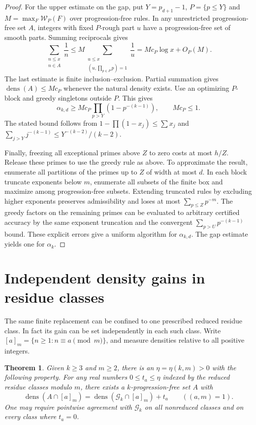 \documentclass[11pt]{article}
\newtheorem{theorem}{Theorem}
\newcommand{\dens}{\operatorname{dens}}
\newcommand{\GP}{\mathcal G_k}
\newcommand{\weight}{\mathcal W}
\begin{document}
\begin{proof}
For the upper estimate on the gap, put $Y=p_{d+1}-1$, $P=\{p\le Y\}$ and $M=\max_F\weight_P(F)$ over progression-free rules. In any unrestricted progression-free set $A$, integers with fixed $P$-rough part $u$ have a progression-free set of smooth parts. Summing reciprocals gives
\[
 \sum_{\substack{n\le x\\n\in A}}\frac1n
 \le M\sum_{\substack{u\le x\\ (u,\prod_{p\in P}p)=1}}\frac1u
 = Mc_P\log x+O_P(M).
\]
The last estimate is finite inclusion--exclusion. Partial summation gives $\dens(A)\le Mc_P$ whenever the natural density exists. Use an optimizing $P$-block and greedy singletons outside $P$. This gives
\[
  \alpha_{k,d}\ge Mc_P\prod_{p>Y}(1-p^{-(k-1)}),\qquad Mc_P\le1.
\]
The stated bound follows from $1-\prod(1-x_j)\le\sum x_j$ and $\sum_{j>Y}j^{-(k-1)}\le Y^{-(k-2)}/(k-2)$.

Finally, freezing all exceptional primes above $Z$ to zero costs at most $h/Z$. Release these primes to use the greedy rule as above. To approximate the result, enumerate all partitions of the primes up to $Z$ of width at most $d$. In each block truncate exponents below $m$, enumerate all subsets of the finite box and maximize among progression-free subsets. Extending truncated rules by excluding higher exponents preserves admissibility and loses at most $\sum_{p\le Z}p^{-m}$. The greedy factors on the remaining primes can be evaluated to arbitrary certified accuracy by the same exponent truncation and the convergent $\sum_{p>U}p^{-(k-1)}$ bound. These explicit errors give a uniform algorithm for $\alpha_{k,d}$. The gap estimate yields one for $\alpha_k$.
\end{proof}

\section{Independent density gains in residue classes}

The same finite replacement can be confined to one prescribed reduced residue class. In fact its gain can be set independently in each such class. Write $[a]_m=\{n\ge1:n\equiv a\pmod m\}$, and measure densities relative to all positive integers.

\begin{theorem}\label{residues}
Given $k\ge3$ and $m\ge2$, there is an $\eta=\eta(k,m)>0$ with the following property. For any real numbers $0\le t_a\le\eta$ indexed by the reduced residue classes modulo $m$, there exists a $k$-progression-free set $A$ with
\[
 \dens(A\cap[a]_m)=\dens(\GP\cap[a]_m)+t_a
       \qquad ((a,m)=1).
\]
One may require pointwise agreement with $\GP$ on all nonreduced classes and on every class where $t_a=0$.
\end{theorem}
\end{document}
